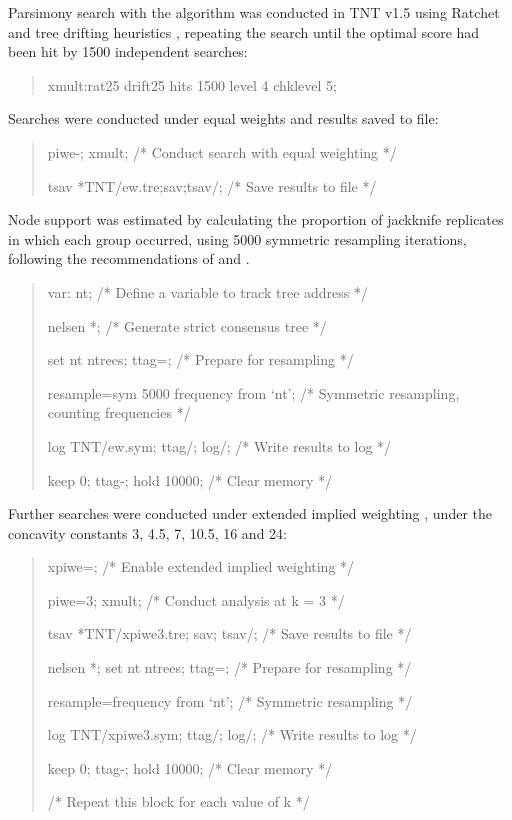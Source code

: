 \documentclass[openany]{book}
\begin{document}
Parsimony search with the \citet{Fitch1971} algorithm was conducted in
TNT v1.5 \citep{Goloboff2016} using Ratchet and tree drifting heuristics
\citep{Goloboff1999, Nixon1999}, repeating the search until the optimal
score had been hit by 1500 independent searches:

\begin{quote}
xmult:rat25 drift25 hits 1500 level 4 chklevel 5;
\end{quote}

Searches were conducted under equal weights and results saved to file:

\begin{quote}
piwe-; xmult; {/* Conduct search with equal weighting */}

tsav *TNT/ew.tre;sav;tsav/; {/* Save results to file */}
\end{quote}

Node support was estimated by calculating the proportion of jackknife
replicates in which each group occurred, using 5000 symmetric resampling
iterations, following the recommendations of \citet{Kopuchian2010} and
\citet{Simmons2011}.

\begin{quote}
var: nt; {/* Define a variable to track tree address */}

nelsen *; {/* Generate strict consensus tree */}

set nt ntrees; ttag=; {/* Prepare for resampling */}

resample=sym 5000 frequency from `nt'; {/* Symmetric resampling,
counting frequencies */}

log TNT/ew.sym; ttag/; log/; {/* Write results to log */}

keep 0; ttag-; hold 10000; {/* Clear memory */}
\end{quote}

Further searches were conducted under extended implied weighting
\citep{Goloboff1997, Goloboff2014}, under the concavity constants 3,
4.5, 7, 10.5, 16 and 24:

\begin{quote}
xpiwe=; {/* Enable extended implied weighting */}

piwe=3; xmult; {/* Conduct analysis at k = 3 */}

tsav *TNT/xpiwe3.tre; sav; tsav/; {/* Save results to file */}

nelsen *; set nt ntrees; ttag=; {/* Prepare for resampling */}

resample=frequency from `nt'; {/* Symmetric resampling */}

log TNT/xpiwe3.sym; ttag/; log/; {/* Write results to log */}

keep 0; ttag-; hold 10000; {/* Clear memory */}

{/* Repeat this block for each value of k */}
\end{quote}
\end{document}
